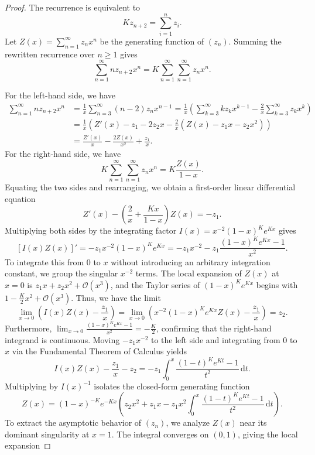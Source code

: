 \begin{proof}
  The recurrence is equivalent to
  $$Kz_{n+2} = \sum_{i=1}^n z_i.$$
  Let $Z(x) = \sum_{n=1}^\infty z_n x^n$ be the generating function of $(z_n)$. Summing the rewritten recurrence over $n\ge 1$ gives
  $$\sum_{n=1}^\infty n z_{n+2} x^n = K \sum_{n=1}^\infty \sum_{n=1}^\infty z_n x^n.$$

  For the left-hand side, we have
  \begin{align*}
    \sum_{n=1}^\infty n z_{n+2} x^n
     & = \frac{1}{x} \sum_{n=3}^\infty (n-2) z_n x^{n-1} = \frac{1}{x} \left( \sum_{k=3}^\infty k z_k x^{k-1} - \frac{2}{x} \sum_{k=3}^\infty z_k x^k \right) \\
     & = \frac{1}{x} \left(Z'(x) - z_1 - 2z_2 x - \frac{2}{x} \left(Z(x) - z_1 x - z_2 x^2\right) \right)                                                     \\
     & = \frac{Z'(x)}{x} - \frac{2Z(x)}{x^2} + \frac{z_1}{x}.
  \end{align*}
  For the right-hand side, we have
  $$K \sum_{n=1}^\infty \sum_{n=1}^\infty z_n x^n = K \frac{Z(x)}{1-x}.$$
  Equating the two sides and rearranging, we obtain a first-order linear differential equation
  $$Z'(x) - \left( \frac{2}{x} + \frac{Kx}{1-x} \right) Z(x) = -z_1.$$
  Multiplying both sides by the integrating factor $I(x) = x^{-2} (1-x)^K e^{Kx}$ gives
  $$[I(x) Z(x)]' = -z_1 x^{-2} (1-x)^K e^{Kx} = -z_1 x^{-2} - z_1 \frac{(1-x)^K e^{Kx} - 1}{x^2}.$$
  To integrate this from $0$ to $x$ without introducing an arbitrary integration constant, we group the singular $x^{-2}$ terms. The local expansion of $Z(x)$ at $x=0$ is $z_1 x + z_2 x^2 + \mathcal{O}(x^3)$, and the Taylor series of $(1-x)^K e^{Kx}$ begins with $1 - \frac{K}{2}x^2 + \mathcal{O}(x^3)$. Thus, we have the limit
  $$\lim_{x\to 0} \left( I(x)Z(x) - \frac{z_1}{x} \right) = \lim_{x\to 0} \left( x^{-2} (1-x)^K e^{Kx} Z(x) - \frac{z_1}{x} \right) = z_2.$$
  Furthermore, $\lim_{x\to 0} \frac{(1-x)^K e^{Kx} - 1}{x^2} = -\frac{K}{2}$, confirming that the right-hand integrand is continuous. Moving $-z_1 x^{-2}$ to the left side and integrating from $0$ to $x$ via the Fundamental Theorem of Calculus yields
  $$I(x) Z(x) - \frac{z_1}{x} - z_2 = -z_1 \int_0^x \frac{(1-t)^K e^{Kt} - 1}{t^2} \, \mathrm{d}t.$$
  Multiplying by $I(x)^{-1}$ isolates the closed-form generating function
  $$Z(x) = (1-x)^{-K} e^{-Kx} \left( z_2 x^2 + z_1 x - z_1 x^2 \int_0^x \frac{(1-t)^K e^{Kt} - 1}{t^2} \, \mathrm{d}t \right).$$
  To extract the asymptotic behavior of $(z_n)$, we analyze $Z(x)$ near its dominant singularity at $x=1$. The integral converges on $(0, 1)$, giving the local expansion

\end{proof}
